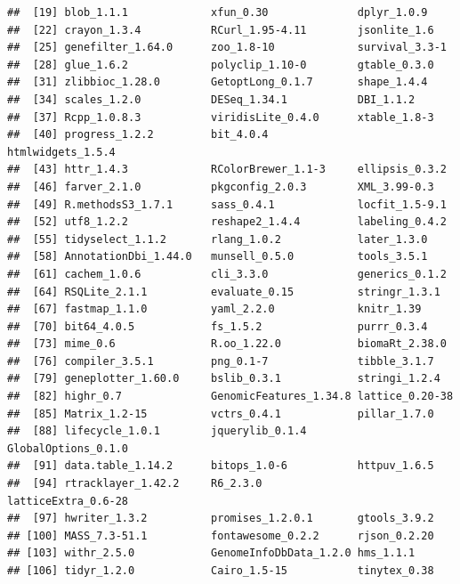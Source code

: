 \documentclass[]{article}
\begin{document}
\begin{verbatim}
##  [19] blob_1.1.1             xfun_0.30              dplyr_1.0.9           
##  [22] crayon_1.3.4           RCurl_1.95-4.11        jsonlite_1.6          
##  [25] genefilter_1.64.0      zoo_1.8-10             survival_3.3-1        
##  [28] glue_1.6.2             polyclip_1.10-0        gtable_0.3.0          
##  [31] zlibbioc_1.28.0        GetoptLong_0.1.7       shape_1.4.4           
##  [34] scales_1.2.0           DESeq_1.34.1           DBI_1.1.2             
##  [37] Rcpp_1.0.8.3           viridisLite_0.4.0      xtable_1.8-3          
##  [40] progress_1.2.2         bit_4.0.4              htmlwidgets_1.5.4     
##  [43] httr_1.4.3             RColorBrewer_1.1-3     ellipsis_0.3.2        
##  [46] farver_2.1.0           pkgconfig_2.0.3        XML_3.99-0.3          
##  [49] R.methodsS3_1.7.1      sass_0.4.1             locfit_1.5-9.1        
##  [52] utf8_1.2.2             reshape2_1.4.4         labeling_0.4.2        
##  [55] tidyselect_1.1.2       rlang_1.0.2            later_1.3.0           
##  [58] AnnotationDbi_1.44.0   munsell_0.5.0          tools_3.5.1           
##  [61] cachem_1.0.6           cli_3.3.0              generics_0.1.2        
##  [64] RSQLite_2.1.1          evaluate_0.15          stringr_1.3.1         
##  [67] fastmap_1.1.0          yaml_2.2.0             knitr_1.39            
##  [70] bit64_4.0.5            fs_1.5.2               purrr_0.3.4           
##  [73] mime_0.6               R.oo_1.22.0            biomaRt_2.38.0        
##  [76] compiler_3.5.1         png_0.1-7              tibble_3.1.7          
##  [79] geneplotter_1.60.0     bslib_0.3.1            stringi_1.2.4         
##  [82] highr_0.7              GenomicFeatures_1.34.8 lattice_0.20-38       
##  [85] Matrix_1.2-15          vctrs_0.4.1            pillar_1.7.0          
##  [88] lifecycle_1.0.1        jquerylib_0.1.4        GlobalOptions_0.1.0   
##  [91] data.table_1.14.2      bitops_1.0-6           httpuv_1.6.5          
##  [94] rtracklayer_1.42.2     R6_2.3.0               latticeExtra_0.6-28   
##  [97] hwriter_1.3.2          promises_1.2.0.1       gtools_3.9.2          
## [100] MASS_7.3-51.1          fontawesome_0.2.2      rjson_0.2.20          
## [103] withr_2.5.0            GenomeInfoDbData_1.2.0 hms_1.1.1             
## [106] tidyr_1.2.0            Cairo_1.5-15           tinytex_0.38
\end{verbatim}
\end{document}
